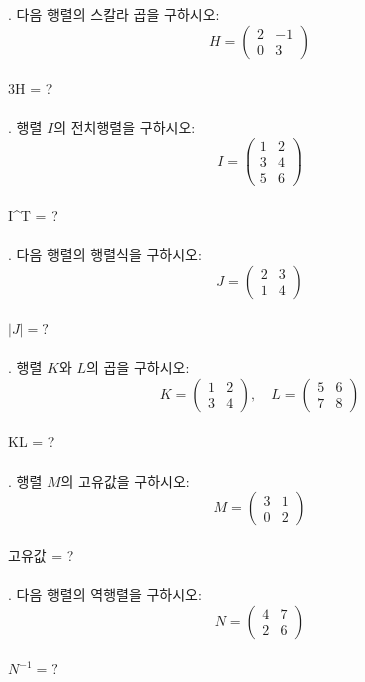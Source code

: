 \documentclass[fleqn]{article}
\begin{document}
. 다음 행렬의 스칼라 곱을 구하시오:  
\[
H = \begin{pmatrix}
2 & -1 \\
0 & 3
\end{pmatrix}
\]  
\\
3H = ? \\\\

. 행렬 \( I \)의 전치행렬을 구하시오:  
\[
I = \begin{pmatrix}
1 & 2 \\
3 & 4 \\
5 & 6
\end{pmatrix}
\]  
\\
I^T = ? \\\\

. 다음 행렬의 행렬식을 구하시오:  
\[
J = \begin{pmatrix}
2 & 3 \\
1 & 4
\end{pmatrix}
\]  
\\
\(|J| = ?\) \\\\

. 행렬 \( K \)와 \( L \)의 곱을 구하시오:  
\[
K = \begin{pmatrix}
1 & 2 \\
3 & 4
\end{pmatrix}, \quad 
L = \begin{pmatrix}
5 & 6 \\
7 & 8
\end{pmatrix}
\]  
\\
KL = ? \\\\

. 행렬 \( M \)의 고유값을 구하시오:  
\[
M = \begin{pmatrix}
3 & 1 \\
0 & 2
\end{pmatrix}
\]  
\\
고유값 = ? \\\\

. 다음 행렬의 역행렬을 구하시오:  
\[
N = \begin{pmatrix}
4 & 7 \\
2 & 6
\end{pmatrix}
\]  
\\
\( N^{-1} = ? \) \\\\
\end{document}
